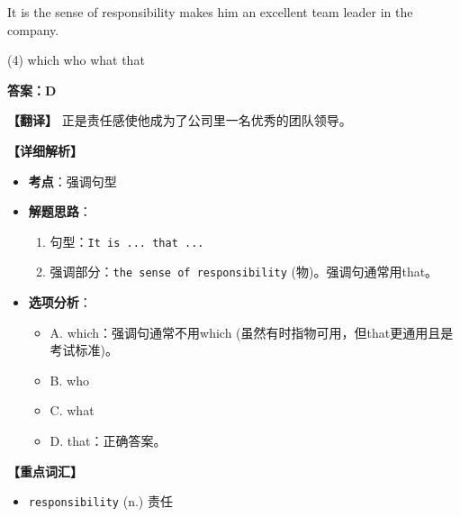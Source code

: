 \documentclass[11pt, a4paper]{article}
\newcommand{\analysis}[4]{
    \begin{solutionbox}
        \textbf{答案：#1}
        
        \textbf{【翻译】} #2
        
        \textbf{【详细解析】}
        #3
        
        \textbf{【重点词汇】}
        #4
    \end{solutionbox}
}
\newcommand{\blank}{\underline{\hspace{1.5cm}}}
\begin{document}
\begin{questions}
    \item It is the sense of responsibility \blank makes him an excellent team leader in the company.
    \begin{tasks}(4)
        \task which \task who \task what \task that
    \end{tasks}
    \analysis{D}{正是责任感使他成为了公司里一名优秀的团队领导。}{
        \begin{itemize}
            \item \textbf{考点}：强调句型
            \item \textbf{解题思路}：
                \begin{enumerate}
                    \item 句型：\texttt{It is ... that ...}
                    \item 强调部分：\texttt{the sense of responsibility} (物)。强调句通常用that。
                \end{enumerate}
            \item \textbf{选项分析}：
                \begin{itemize}
                    \item A. which：强调句通常不用which (虽然有时指物可用，但that更通用且是考试标准)。
                    \item B. who
                    \item C. what
                    \item D. that：正确答案。
                \end{itemize}
        \end{itemize}
    }{
        \begin{itemize}
            \item \texttt{responsibility} (n.) 责任
        \end{itemize}
    }


\end{questions}
\end{document}
